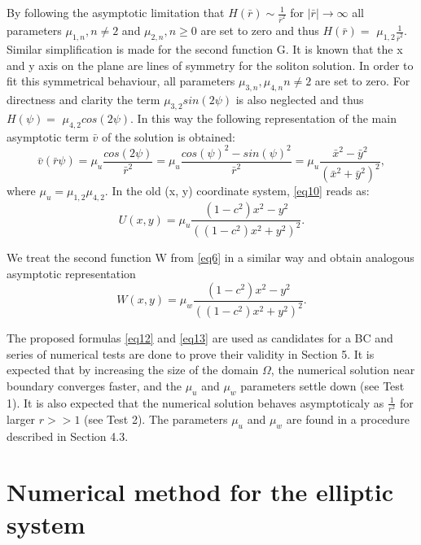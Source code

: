 \documentclass[12pt]{article}
\theoremstyle{theorem}
\theoremstyle{defi}
\begin{document}
By following the asymptotic limitation that $H(\bar{r}) \sim \frac{1}{\bar{r}^2} $  for $|\bar{r}| \rightarrow \infty $ all parameters $\mu_{1,n}, n \neq 2$ and $\mu_{2,n},  n \geq 0$  are set to zero  and thus $H(\bar{r}) =$ $\mu_{1,2} \frac{1}{ \bar{r}^2 }$.
Similar simplification is made for the second function G. It is known that the x and y axis on the plane are lines of symmetry for the soliton solution. In order to fit this symmetrical behaviour, all parameters $\mu_{3,n},\mu_{4,n}  n \neq 2$  are set to zero. For directness and clarity the term $\mu_{3,2}sin(2\psi)$ is also neglected and thus $H(\psi) = $ $\mu_{4,2} cos(2 \psi)$. In this way the following representation of the main asymptotic term $\bar{v}$ of the solution is obtained:
\begin{equation}
\bar{v}(\bar{r} \psi) = \mu_u \frac{cos(2 \psi)}{ \bar{r}^2 } =
 \mu_u \frac{cos(\psi) ^ 2 - sin(\psi)^2}{ \bar{r}^2 } =
 \mu_u \frac{\bar{x}  ^ 2 - \bar{y}  ^ 2}{( \bar{x}  ^ 2 + \bar{y}  ^ 2)^2 } , \label{eq10}
\end{equation}
where $\mu_u = \mu_{1,2} \mu_{4,2}$. In the old (x, y) coordinate system, \eqref{eq10}  reads as:
\begin{equation}
U(x,y) = \mu_u \frac{(1-c^2)x^2 - y^2}{ ( (1-c^2)x^2 + y^2 )^2 }. \label{eq12}
\end{equation}

We treat the second function W from \eqref{eq6}  in a similar way and obtain analogous asymptotic representation
\begin{equation}
W(x,y) = \mu_w \frac{(1-c^2)x^2 - y^2}{ ( (1-c^2)x^2 + y^2 )^2 }. \label{eq13}
\end{equation}

The proposed formulas \eqref{eq12} and \eqref{eq13} are used as candidates for a BC and series of numerical tests are done to prove their validity in Section 5.
It is expected that by increasing the size of the domain $\Omega$, the numerical solution near boundary converges faster, and the $\mu_u$ and $\mu_w$ parameters settle down (see Test 1). It is also expected that the numerical solution behaves asymptoticaly as $\frac{1}{r^2}$ for larger $r >> 1$ (see Test 2). The parameters $\mu_u$ and $\mu_w$ are found in a procedure described in Section 4.3.

\section{Numerical method for the elliptic system}
\end{document}
